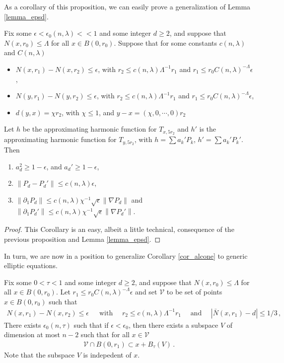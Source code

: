 \documentclass[11pt]{article}
\begin{document}
As a corollary of this proposition, we can easily prove a generalization of Lemma \ref{lemma_epsd}.
\begin{corollary}\label{cor_epsd}
 Fix some $\epsilon<\epsilon_0(n,\lambda)<<1$ and some integer $d\geq 2$, and suppose that $N(x,r_0)\leq \Lambda$ for all $x\in B(0,r_0)$. Suppose that for some constants $c(n,\lambda)$ and $C(n,\lambda)$
 \begin{itemize}
  \item $N(x,r_1)-N(x,r_2)\leq \epsilon$, with $r_2\leq c(n,\lambda)\Lambda^{-1} r_1$ and $r_1\leq r_0 C(n,\lambda)^{-\Lambda}\epsilon$,
  \item $N(y,r_1)-N(y,r_2)\leq \epsilon$, with $r_2\leq c(n,\lambda)\Lambda^{-1} r_1$ and $r_1\leq r_0 C(n,\lambda)^{-\Lambda}\epsilon$,
  \item $d(y,x)=\chi r_2$, with $\chi\leq 1$, and $y-x=(\chi,0,\cdots,0)r_2$
 \end{itemize}
Let $h$ be the approximating harmonic function for $T_{x,5 r_2}$ and $h'$ is the approximating harmonic function for $T_{y,5 r_2}$, with $h=\sum a_k' P_k$, $h'=\sum a_k' P_k'$. Then 
\begin{enumerate}
 \item $a_d^2\geq 1-\epsilon$, and $a_d'\geq 1-\epsilon$,
 \item ${\left\|{P_d-P_d'}\right\|}\leq c(n,\lambda)\epsilon$,
 \item ${\left\|{\partial_1 P_d}\right\|}\leq c(n,\lambda) \chi^{-1}\sqrt{\epsilon}{\left\|{\nabla P_d}\right\|}$ and ${\left\|{\partial_1 P_d'}\right\|}\leq c(n,\lambda) \chi^{-1}\sqrt{\epsilon}{\left\|{\nabla P_d'}\right\|}$.
\end{enumerate}
\end{corollary}
\begin{proof}
 This Corollary is an easy, albeit a little technical, consequence of the previous proposition and Lemma \ref{lemma_epsd}.
\end{proof}

In turn, we are now in a position to generalize Corollary \ref{cor_alcone} to generic elliptic equations.
\begin{corollary}\label{cor_alcone_ell}\label{c:cone_splitting}
Fix some $0<\tau<1$ and some integer $d\geq 2$, and suppose that $N(x,r_0)\leq \Lambda$ for all $x\in B(0,r_0)$. Let $r_1\leq r_0 C(n,\lambda)^{-\Lambda} \epsilon$ and set ${\mathcal{V}}$ to be set of points $x\in B(0,r_0)$ such that 
\begin{gather}
N(x,r_1)-N(x,r_2)\leq \epsilon\, \quad \text{ with } \quad r_2\leq c(n,\lambda)\Lambda^{-1} r_1 \quad \text { and } \quad {\left|{\bar N(x,r_1)-d}\right|}\leq 1/3\, ,
\end{gather}
There exists $\epsilon_0(n,\tau)$ such that if $\epsilon<\epsilon_0$, then there exists a subspace $V$ of dimension at most $n-2$ such that for all $x\in {\mathcal{V}}$
\begin{gather}
 {\mathcal{V}}\cap B(0,r_1)\subset x+B_\tau (V)\, .
\end{gather}
Note that the subspace $V$ is indepedent of $x$.
\end{corollary}
\end{document}
